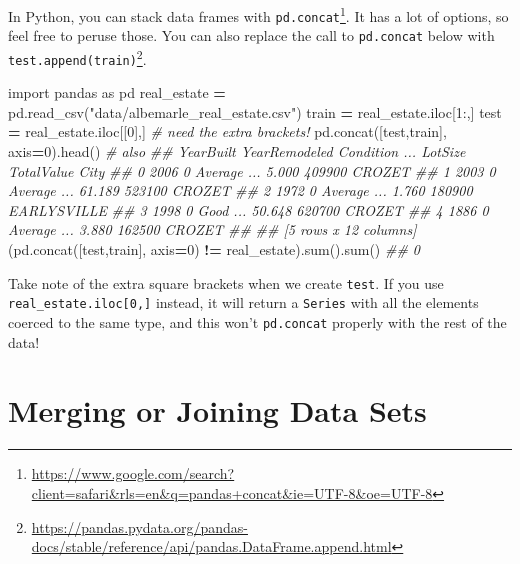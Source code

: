 \documentclass[
  12pt,
]{krantz}
\makeatletter
\newenvironment{Shaded}{\begin{snugshade}}{\end{snugshade}}
\newcommand{\BuiltInTok}[1]{#1}
\newcommand{\CommentTok}[1]{\textcolor[rgb]{0.37,0.37,0.37}{\textit{#1}}}
\newcommand{\DecValTok}[1]{\textcolor[rgb]{0.06,0.06,0.06}{#1}}
\newcommand{\ImportTok}[1]{#1}
\newcommand{\NormalTok}[1]{#1}
\newcommand{\OperatorTok}[1]{\textcolor[rgb]{0.43,0.43,0.43}{\textbf{#1}}}
\newcommand{\StringTok}[1]{\textcolor[rgb]{0.5,0.5,0.5}{#1}}
\renewcommand{\href}[2]{#2\footnote{\url{#1}}}
\newenvironment{kframe}{%
\medskip{}
\setlength{\fboxsep}{.8em}
 \def\at@end@of@kframe{}%
 \ifinner\ifhmode%
  \def\at@end@of@kframe{\end{minipage}}%
  \begin{minipage}{\columnwidth}%
 \fi\fi%
 \def\FrameCommand##1{\hskip\@totalleftmargin \hskip-\fboxsep
 \colorbox{shadecolor}{##1}\hskip-\fboxsep
     \hskip-\linewidth \hskip-\@totalleftmargin \hskip\columnwidth}%
 \MakeFramed {\advance\hsize-\width
   \@totalleftmargin\z@ \linewidth\hsize
   \@setminipage}}%
 {\par\unskip\endMakeFramed%
 \at@end@of@kframe}
\renewenvironment{Shaded}{\begin{kframe}}{\end{kframe}}
\makeatother
\begin{document}
In Python, you can stack data frames with \href{https://www.google.com/search?client=safari\&rls=en\&q=pandas+concat\&ie=UTF-8\&oe=UTF-8}{\texttt{pd.concat}}. It has a lot of options, so feel free to peruse those. You can also replace the call to \texttt{pd.concat} below with \href{https://pandas.pydata.org/pandas-docs/stable/reference/api/pandas.DataFrame.append.html}{\texttt{test.append(train)}}.

\begin{Shaded}
\begin{Highlighting}[]
\ImportTok{import}\NormalTok{ pandas }\ImportTok{as}\NormalTok{ pd}
\NormalTok{real\_estate }\OperatorTok{=}\NormalTok{ pd.read\_csv(}\StringTok{"data/albemarle\_real\_estate.csv"}\NormalTok{)}
\NormalTok{train }\OperatorTok{=}\NormalTok{ real\_estate.iloc[}\DecValTok{1}\NormalTok{:,]}
\NormalTok{test }\OperatorTok{=}\NormalTok{ real\_estate.iloc[[}\DecValTok{0}\NormalTok{],] }\CommentTok{\# need the extra brackets!}
\NormalTok{pd.concat([test,train], axis}\OperatorTok{=}\DecValTok{0}\NormalTok{).head() }\CommentTok{\# also }
\CommentTok{\#\#    YearBuilt  YearRemodeled Condition  ...  LotSize  TotalValue         City}
\CommentTok{\#\# 0       2006              0   Average  ...    5.000      409900       CROZET}
\CommentTok{\#\# 1       2003              0   Average  ...   61.189      523100       CROZET}
\CommentTok{\#\# 2       1972              0   Average  ...    1.760      180900  EARLYSVILLE}
\CommentTok{\#\# 3       1998              0      Good  ...   50.648      620700       CROZET}
\CommentTok{\#\# 4       1886              0   Average  ...    3.880      162500       CROZET}
\CommentTok{\#\# }
\CommentTok{\#\# [5 rows x 12 columns]}
\NormalTok{(pd.concat([test,train], axis}\OperatorTok{=}\DecValTok{0}\NormalTok{) }\OperatorTok{!=}\NormalTok{ real\_estate).}\BuiltInTok{sum}\NormalTok{().}\BuiltInTok{sum}\NormalTok{()}
\CommentTok{\#\# 0}
\end{Highlighting}
\end{Shaded}

Take note of the extra square brackets when we create \texttt{test}. If you use \texttt{real\_estate.iloc{[}0,{]}} instead, it will return a \texttt{Series} with all the elements coerced to the same type, and this won't \texttt{pd.concat} properly with the rest of the data!

\hypertarget{merging-or-joining-data-sets}{%
\section{Merging or Joining Data Sets}\label{merging-or-joining-data-sets}}
\end{document}
